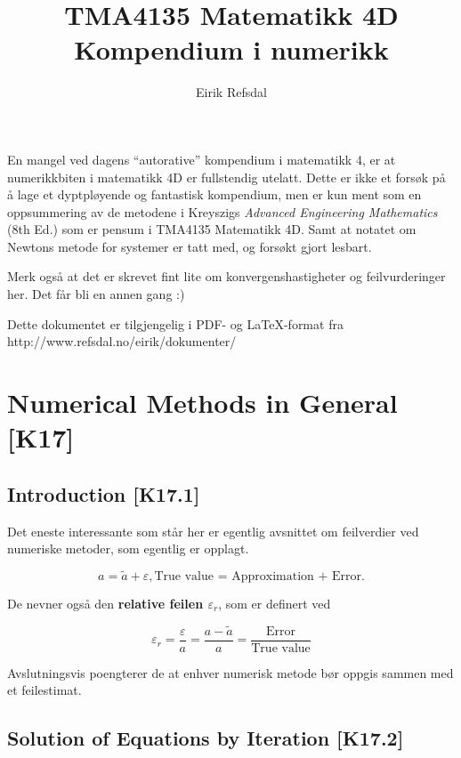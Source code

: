 \documentclass[norsk, a4paper, 12pt, titlepage]{article}
\title{TMA4135 Matematikk 4D\\Kompendium i numerikk}
\author{Eirik Refsdal}
\begin{document}
\maketitle

\newpage
En mangel ved dagens ``autorative'' kompendium i matematikk 4, er at
numerikkbiten i matematikk 4D er fullstendig utelatt.  Dette er ikke
et forsøk på å lage et dyptpløyende og fantastisk kompendium, men er
kun ment som en oppsummering av de metodene i Kreyszigs
\textit{Advanced Engineering Mathematics} (8th Ed.) som er pensum i
TMA4135 Matematikk 4D.  Samt at notatet om Newtons metode for systemer
er tatt med, og forsøkt gjort lesbart.

Merk også at det er skrevet fint lite om konvergenshastigheter og
feilvurderinger her.  Det får bli en annen gang :)

Dette dokumentet er tilgjengelig i PDF- og LaTeX-format fra \newline
http://www.refsdal.no/eirik/dokumenter/


\newpage
\tableofcontents

\newpage


\section{Numerical Methods in General [K17]}

\subsection{Introduction [K17.1]}
Det eneste interessante som står her er egentlig avsnittet om
feilverdier ved numeriske metoder, som egentlig er opplagt.

\begin{equation}
a = \tilde{a} + \varepsilon, \text{True value = Approximation +
Error.}
\end{equation}

De nevner også den \textbf{relative feilen $\varepsilon_{r}$}, som er
definert ved

\begin{equation}
\varepsilon_{r} = \frac{\varepsilon}{a} = \frac{a - \tilde{a}}{a} =
\frac{\text{Error}}{\text{True value}}
\end{equation}

Avslutningsvis poengterer de at enhver numerisk metode bør oppgis
sammen med et feilestimat.


\subsection{Solution of Equations by Iteration [K17.2]}
\end{document}
